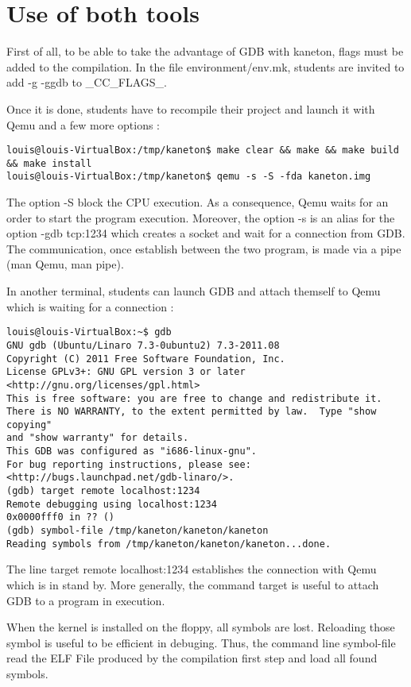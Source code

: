 \section{Use of both tools}

First of all, to be able to take the advantage of GDB with kaneton, flags must be added to the compilation. In the file environment/env.mk, students are invited to add -g -ggdb to \_CC\_FLAGS\_.

Once it is done, students have to recompile their project and launch it with Qemu and a few more options :
\begin{verbatim}
louis@louis-VirtualBox:/tmp/kaneton$ make clear && make && make build && make install
louis@louis-VirtualBox:/tmp/kaneton$ qemu -s -S -fda kaneton.img
\end{verbatim}

The option -S block the CPU execution. As a consequence, Qemu waits for an order to start the program execution. Moreover, the option -s is an alias for the option -gdb tcp:1234 which creates a socket and wait for a connection from GDB. The communication, once establish between the two program, is made via a pipe (man Qemu, man pipe).

In another terminal, students can launch GDB and attach themself to Qemu which is waiting for a connection :
\begin{verbatim}
louis@louis-VirtualBox:~$ gdb
GNU gdb (Ubuntu/Linaro 7.3-0ubuntu2) 7.3-2011.08
Copyright (C) 2011 Free Software Foundation, Inc.
License GPLv3+: GNU GPL version 3 or later <http://gnu.org/licenses/gpl.html>
This is free software: you are free to change and redistribute it.
There is NO WARRANTY, to the extent permitted by law.  Type "show copying"
and "show warranty" for details.
This GDB was configured as "i686-linux-gnu".
For bug reporting instructions, please see:
<http://bugs.launchpad.net/gdb-linaro/>.
(gdb) target remote localhost:1234
Remote debugging using localhost:1234
0x0000fff0 in ?? ()
(gdb) symbol-file /tmp/kaneton/kaneton/kaneton
Reading symbols from /tmp/kaneton/kaneton/kaneton...done.
\end{verbatim}

The line target remote localhost:1234 establishes the connection with Qemu which is in stand by. More generally, the command target is useful to attach GDB to a program in execution.

When the kernel is installed on the floppy, all symbols are lost. Reloading those symbol is useful to be efficient in debuging. Thus, the command line symbol-file read the ELF File produced by the compilation first step and load all found symbols.

